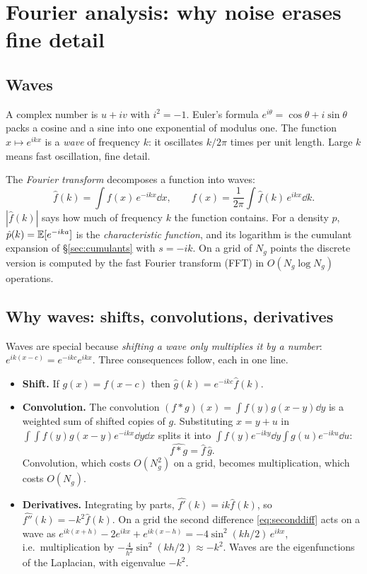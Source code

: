 \section{Fourier analysis: why noise erases fine detail}\label{sec:fourier}

\subsection{Waves}

A complex number is $u+iv$ with $i^2=-1$. Euler's formula $e^{i\theta}=\cos\theta+i\sin\theta$ packs a cosine and a
sine into one exponential of modulus one. The function $x\mapsto e^{ikx}$ is a \emph{wave} of frequency $k$: it
oscillates $k/2\pi$ times per unit length. Large $k$ means fast oscillation, fine detail.

The \emph{Fourier transform} decomposes a function into waves:
\begin{equation}\label{eq:ft}
  \hat f(k)=\int f(x)\,e^{-ikx}\dd x,\qquad f(x)=\frac{1}{2\pi}\int\hat f(k)\,e^{ikx}\dd k .
\end{equation}
$|\hat f(k)|$ says how much of frequency $k$ the function contains. For a density $p$, $\hat p(k)=\mathbb{E}[e^{-ika}]$ is
the \emph{characteristic function}, and its logarithm is the cumulant expansion of \S\ref{sec:cumulants} with
$s=-ik$. On a grid of $N_g$ points the discrete version is computed by the fast Fourier transform (FFT) in
$O(N_g\log N_g)$ operations.

\subsection{Why waves: shifts, convolutions, derivatives}

Waves are special because \emph{shifting a wave only multiplies it by a number}: $e^{ik(x-c)}=e^{-ikc}e^{ikx}$. Three
consequences follow, each in one line.
\begin{itemize}
\item \textbf{Shift.} If $g(x)=f(x-c)$ then $\hat g(k)=e^{-ikc}\hat f(k)$.
\item \textbf{Convolution.} The convolution $(f*g)(x)=\int f(y)g(x-y)\dd y$ is a weighted sum of shifted copies
  of $g$. Substituting $x=y+u$ in $\int\!\!\int f(y)g(x-y)e^{-ikx}\dd y\dd x$ splits it into
  $\int f(y)e^{-iky}\dd y\int g(u)e^{-iku}\dd u$:
  \begin{equation}\label{eq:convthm}
    \widehat{f*g}=\hat f\,\hat g .
  \end{equation}
  Convolution, which costs $O(N_g^2)$ on a grid, becomes multiplication, which costs $O(N_g)$.
\item \textbf{Derivatives.} Integrating by parts, $\widehat{f'}(k)=ik\hat f(k)$, so $\widehat{f''}(k)=-k^2\hat f(k)$. On a grid the
  second difference \eqref{eq:seconddiff} acts on a wave as
  $e^{ik(x+h)}-2e^{ikx}+e^{ik(x-h)}=-4\sin^2(kh/2)\,e^{ikx}$, i.e.\ multiplication by $-\tfrac{4}{h^2}\sin^2(kh/2)\approx-k^2$.
  Waves are the eigenfunctions of the Laplacian, with eigenvalue $-k^2$.
\end{itemize}

